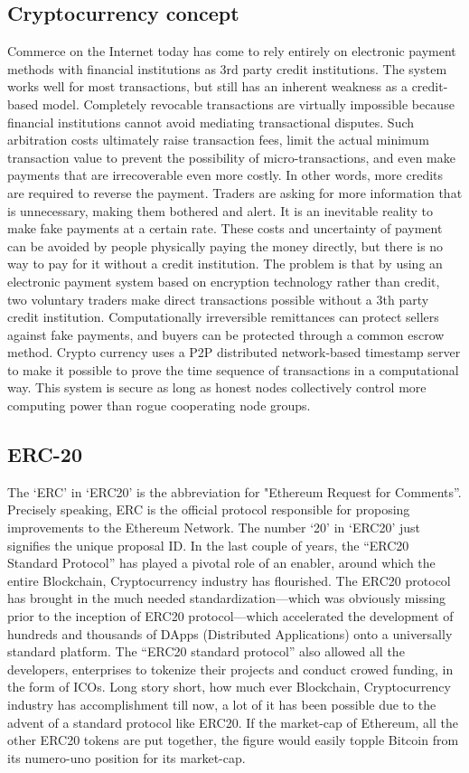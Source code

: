 \documentclass[conference]{IEEEtran}
\begin{document}
\subsection{Cryptocurrency concept}
Commerce on the Internet today has come to rely entirely on electronic payment methods with financial institutions as 3rd party credit institutions. The system works well for most transactions, but still has an inherent weakness as a credit-based model.
Completely revocable transactions are virtually impossible because financial institutions cannot avoid mediating transactional disputes. Such arbitration costs ultimately raise transaction fees, limit the actual minimum transaction value to prevent the possibility of micro-transactions, and even make payments that are irrecoverable even more costly. In other words, more credits are required to reverse the payment. Traders are asking for more information that is unnecessary, making them bothered and alert. It is an inevitable reality to make fake payments at a certain rate. These costs and uncertainty of payment can be avoided by people physically paying the money directly, but there is no way to pay for it without a credit institution. The problem is that by using an electronic payment system based on encryption technology rather than credit, two voluntary traders make direct transactions possible without a 3th party credit institution. Computationally irreversible remittances can protect sellers against fake payments, and buyers can be protected through a common escrow method. Crypto currency uses a P2P distributed network-based timestamp server to make it possible to prove the time sequence of transactions in a computational way. This system is secure as long as honest nodes collectively control more computing power than rogue cooperating node groups.

\subsection{ERC-20}
The ‘ERC’ in ‘ERC20’ is the abbreviation for "Ethereum Request for Comments”. Precisely speaking, ERC is the official protocol responsible for proposing improvements to the Ethereum Network. The number ‘20’ in ‘ERC20’ just signifies the unique proposal ID.
In the last couple of years, the “ERC20 Standard Protocol” has played a pivotal role of an enabler, around which the entire Blockchain, Cryptocurrency industry has flourished. The ERC20 protocol has brought in the much needed standardization—which was obviously missing prior to the inception of ERC20 protocol—which accelerated the development of hundreds and thousands of DApps (Distributed Applications) onto a universally standard platform.
The “ERC20 standard protocol” also allowed all the developers, enterprises to tokenize their projects and conduct crowed funding, in the form of ICOs. Long story short, how much ever Blockchain, Cryptocurrency industry has accomplishment till now, a lot of it has been possible due to the advent of a standard protocol like ERC20. If the market-cap of Ethereum, all the other ERC20 tokens are put together, the figure would easily topple Bitcoin from its numero-uno position for its market-cap.
\end{document}
